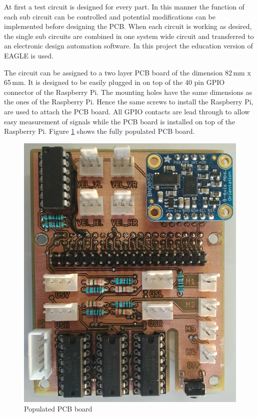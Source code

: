 At first a test circuit is designed for every part. In this manner the function of each sub circuit can be controlled and potential modifications can be implemented before designing the PCB. When each circuit is working as desired, the single sub circuits are combined in one system wide circuit and transferred to an electronic design automation software. In this project the education version of EAGLE \cite{eagle} is used.

The circuit can be assigned to a two layer PCB board of the dimension 82\,mm x 65\,mm. It is designed to be easily plugged in on top of the 40 pin GPIO connector of the Raspberry Pi. The mounting holes have the same dimensions as the ones of the Raspberry Pi. Hence the same screws to install the Raspberry Pi, are used to attach the PCB board. All GPIO contacts are lead through to allow easy measurement of signals while the PCB board is installed on top of the Raspberry Pi. Figure \ref{fig:pcb} shows the fully populated PCB board.

\begin{figure}[H]
\centering
\includegraphics[scale=0.15]{sources/pcb.jpg}
\caption[Populated PCB board]{Populated PCB board}
\label{fig:pcb}
\end{figure}
